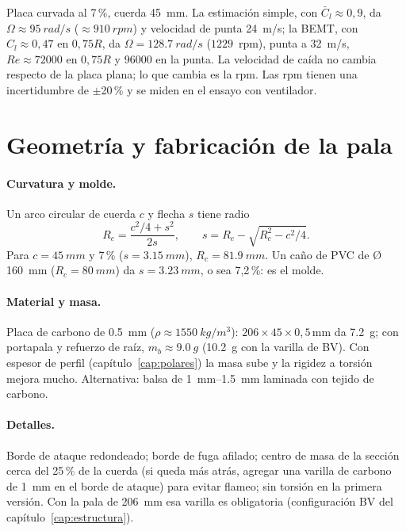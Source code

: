 \begin{resultado}
Placa curvada al 7\,\%, cuerda \SI{45}{mm}. La estimación simple, con $\bar C_l\approx0{,}9$, da
$\Omega\approx\SI{95}{rad/s}$ ($\approx\SI{910}{rpm}$) y velocidad de punta \SI{24}{m/s}; la
BEMT, con $C_l\approx0{,}47$ en $0{,}75R$, da $\Omega=\SI{128.7}{rad/s}$ ($\num{1229}$~rpm),
punta a \SI{32}{m/s}, $Re\approx\num{72000}$ en $0{,}75R$ y \num{96000} en la punta. La
velocidad de caída no cambia respecto de la placa plana; lo que cambia es la rpm. Las
rpm tienen una incertidumbre de $\pm$20\,\% y se miden en el ensayo con ventilador.
\end{resultado}

\section{Geometría y fabricación de la pala}\label{sec:pala}

\paragraph{Curvatura y molde.} Un arco circular de cuerda $c$ y flecha $s$ tiene radio
\begin{equation}
  R_c = \frac{c^2/4 + s^2}{2s}, \qquad s = R_c - \sqrt{R_c^2 - c^2/4}. \label{eq:flecha}
\end{equation}
Para $c=\SI{45}{mm}$ y 7\,\% ($s=\SI{3.15}{mm}$), $R_c=\SI{81.9}{mm}$. Un caño de PVC de
Ø\,\SI{160}{mm} ($R_c=\SI{80}{mm}$) da $s=\SI{3.23}{mm}$, o sea 7,2\,\%: es el molde.

\paragraph{Material y masa.} Placa de carbono de \SI{0.5}{mm} ($\rho\approx\SI{1550}{kg/m^3}$):
$206\times45\times0{,}5$\,mm da \SI{7.2}{g}; con portapala y refuerzo de raíz,
$m_b\approx\SI{9.0}{g}$ (\SI{10.2}{g} con la varilla de BV). Con espesor de perfil
(capítulo~\ref{cap:polares}) la masa sube y la rigidez a torsión mejora mucho. Alternativa: balsa de \SIrange{1}{1.5}{mm} laminada con tejido de
carbono.

\paragraph{Detalles.} Borde de ataque redondeado; borde de fuga afilado; centro de masa de
la sección cerca del 25\,\% de la cuerda (si queda más atrás, agregar una varilla de
carbono de \SI{1}{mm} en el borde de ataque) para evitar flameo; sin torsión en la primera
versión. Con la pala de \SI{206}{mm} esa varilla es obligatoria (configuración BV del
capítulo~\ref{cap:estructura}).

